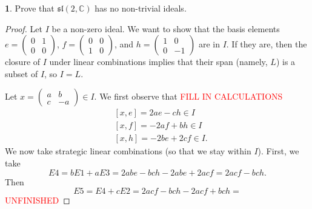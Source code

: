 \documentclass[12pt]{article}
\renewcommand{\sl}{\mathfrak{sl}}
\theoremstyle{definition}
\newtheorem{ex}{}
\begin{document}
\begin{ex}
	Prove that $\sl(2, \mathbb{C})$ has no non-trivial ideals.
\end{ex}
\begin{proof}
    Let $I$ be a non-zero ideal.
    We want to show that the basis elements $e=\begin{pmatrix}0&1\\0&0\end{pmatrix}$, $f=\begin{pmatrix}0&0\\1&0\end{pmatrix}$, and $h=\begin{pmatrix}1&0\\0&-1\end{pmatrix}$ are in $I$.
    If they are, then the closure of $I$ under linear combinations implies that their span (namely, $L$) is a subset of $I$, so $I = L$.
    
    Let $x = \begin{pmatrix}a & b \\ c & -a \end{pmatrix} \in I$.
    We first observe that \textcolor{red}{FILL IN CALCULATIONS} \begin{align*}
         & [x, e] = 2ae - ch \in I \tag{E1} \\
         & [x, f] = -2af + bh \in I \tag{E2} \\
         & [x, h] = -2be + 2cf \in I. \tag{E3}
    \end{align*}
    We now take strategic linear combinations (so that we stay within $I$).
    First, we take $$E4 = bE1 + aE3 = 2abe - bch - 2abe + 2acf = 2acf - bch.$$
    Then $$E5 = E4 + cE2 = 2acf - bch - 2acf + bch = $$
    \textcolor{red}{UNFINISHED}
\end{proof}
\end{document}
